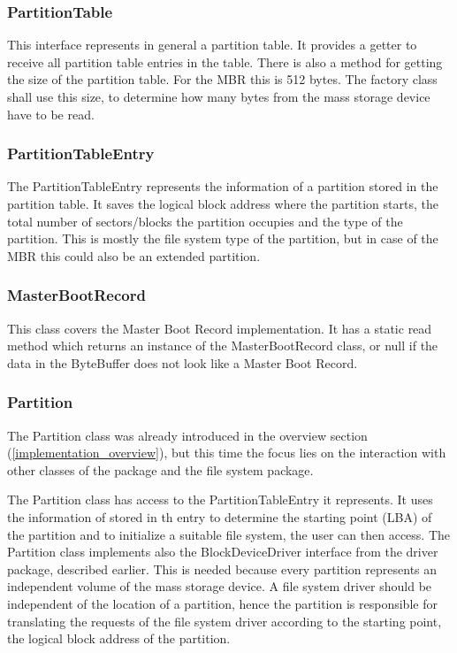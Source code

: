 \subsubsection{PartitionTable}

This interface represents in general a partition table. It provides a getter to receive all partition table entries in the table. There is also a method for getting the size of the partition table. For the MBR this is 512 bytes. The factory class shall use this size, to determine how many bytes from the mass storage device have to be read.

\subsubsection{PartitionTableEntry}

The PartitionTableEntry represents the information of a partition stored in the partition table. It saves the logical block address where the partition starts, the total number of sectors/blocks the partition occupies and the type of the partition. This is mostly the file system type of the partition, but in case of the MBR this could also be an extended partition.

\subsubsection{MasterBootRecord}

This class covers the Master Boot Record implementation. It has a static read method which returns an instance of the MasterBootRecord class, or null if the data in the ByteBuffer does not look like a Master Boot Record.

\subsubsection{Partition}

The Partition class was already introduced in the overview section (\ref{implementation_overview}), but this time the focus lies on the interaction with other classes of the package and the file system package. 

The Partition class has access to the PartitionTableEntry it represents. It uses the information of stored in th entry to determine the starting point (LBA) of the partition and to initialize a suitable file system, the user can then access. The Partition class implements also the BlockDeviceDriver interface from the driver package, described earlier. This is needed because every partition represents an independent volume of the mass storage device. A file system driver should be independent of the location of a partition, hence the partition is responsible for translating the requests of the file system driver according to the starting point, the logical block address of the partition.

